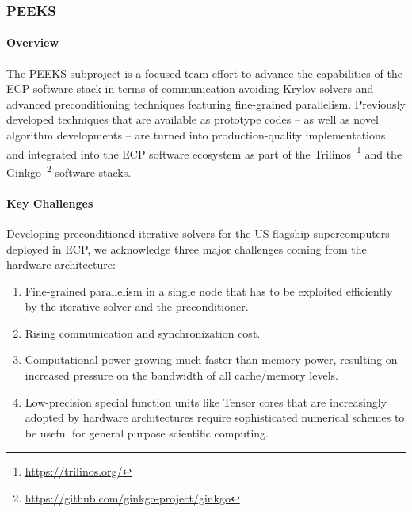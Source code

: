\subsubsection{ PEEKS} 
\paragraph{Overview} 
The PEEKS subproject is a focused team effort to advance the capabilities of the
ECP software stack in terms of communication-avoiding Krylov solvers and
advanced preconditioning techniques featuring fine-grained parallelism.
Previously developed techniques that are available as prototype codes -- as
well as novel algorithm developments -- are turned into production-quality 
implementations and integrated into the ECP software ecosystem 
as part of the Trilinos~\footnote{\url{https://trilinos.org/}} and the  
Ginkgo~\footnote{\url{https://github.com/ginkgo-project/ginkgo}} software 
stacks. 


\paragraph{Key  Challenges}
Developing preconditioned iterative solvers for the US flagship supercomputers 
deployed in ECP, we acknowledge three major challenges coming from the hardware 
architecture:
\begin{enumerate}
\item 
Fine-grained parallelism in a single node that has to be exploited efficiently 
by the iterative solver and the preconditioner.
\item
Rising communication and synchronization cost.
\item
Computational power growing much faster than memory power, resulting on 
increased pressure on the bandwidth of all cache/memory levels.
\item 
Low-precision special function units like Tensor cores that are increasingly 
adopted by hardware architectures require sophisticated numerical schemes to be 
useful for general purpose scientific computing.
\end{enumerate}

